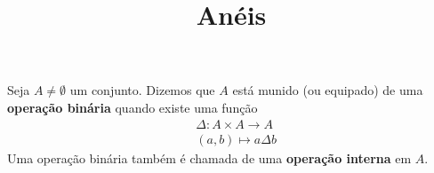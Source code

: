 \documentclass{beamer}
\title{Anéis}
\author[\autor]{\autor}
\institute[\instituto]{\instituto}
\date{}
\begin{document}
    \begin{frame}
        \maketitle
    \end{frame}


    \begin{frame}
        \begin{definicao}
            Seja $A \ne \emptyset$ um conjunto. \pause Dizemos que $A$ está munido \pause (ou equipado) \pause de
            uma \textbf{operação binária} \pause quando existe uma função\pause
            \begin{align*}
                &\Delta : A \times A \to A\\
                &(a,b) \longmapsto a\Delta b
            \end{align*}
            \pause Uma operação binária também é chamada de uma \textbf{operação interna} em $A$.\pause
        \end{definicao}
    \end{frame}
\end{document}
